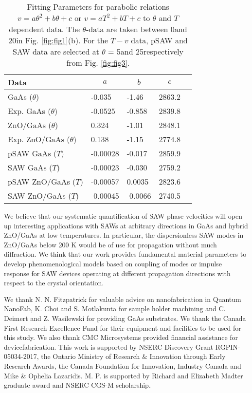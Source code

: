 \documentclass[aps,prb,amsmath,amssymb,footinbib,showpacs,superscriptaddress]{revtex4-1}%
\begin{document}
\begin{table}[t]
\caption{\label{tab:table1}Fitting Parameters for parabolic relations  $v = a\theta^2 + b\theta + c$ or $v = aT^2 + bT + c$ to $\theta$ and $T$ dependent data. The $\theta$-data are taken between 0\textdegree and 20\textdegree in Fig. \ref{fig:fig1}(b). For the $T-v$ data, pSAW and SAW data are selected at $\theta$ = 5\textdegree and 25\textdegree  respectively from Fig. \ref{fig:fig3}.}
\begin{tabular}{lllll} 
\hline\hline
Data&
\multicolumn{1}{c}{$a$}&
\multicolumn{1}{c}{$b$}&
\multicolumn{1}{c}{$c$}\\
\hline
GaAs ($\theta$) \cite{Flannery1999}& -0.035 & -1.46 & 2863.2\\
Exp. GaAs ($\theta$) & -0.0525 & -0.858 & 2839.8\\
ZnO/GaAs ($\theta$) \cite{Kim1994} & 0.324 & -1.01 & 2848.1\\
Exp. ZnO/GaAs ($\theta$) & 0.138 & -1.15 & 2774.8\\
\hline
pSAW GaAs ($T$) & -0.00028 & -0.017 & 2859.9\\
SAW GaAs ($T$) & -0.00023 & -0.030 & 2759.2\\
pSAW ZnO/GaAs ($T$) & -0.00057 & 0.0035 & 2823.6\\
SAW ZnO/GaAs ($T$) & -0.00045 & -0.0066 & 2740.5\\
\hline\hline
\end{tabular}
\end{table}

We believe that our systematic quantification of SAW phase velocities will open up interesting applications with SAWs at arbitrary directions in GaAs and hybrid ZnO/GaAs at low temperatures. In particular, the dispersionless SAW modes in ZnO/GaAs below 200 K would be of use for propagation without much diffraction. We think that our work provides fundamental material parameters to develop phenomenological models based on coupling of modes \cite{Brown1989} or impulse response\cite{Hartmann1988} for SAW devices operating at different propagation directions with respect to the crystal orientation. 


\begin{acknowledgments}
We thank N. N. Fitzpatrick for valuable advice on nanofabrication in Quantum NanoFab, K. Choi and S. Motlakunta for sample holder machining and C. Deimert and Z. Wasilewski for providing GaAs substrates. We thank the Canada First Research Excellence Fund for their equipment and facilities to be used for this study. We also thank CMC Microsystems provided financial assistance for devicefabrication. This work is supported by NSERC Discovery Grant RGPIN-05034-2017, the Ontario Ministry of Research \& Innovation through Early Research Awards, the Canada Foundation for Innovation, Industry Canada and Mike \& Ophelia Lazaridis. M. P. is supported by Richard and Elizabeth Madter graduate award and NSERC CGS-M scholarship. 
\end{acknowledgments}
\end{document}

